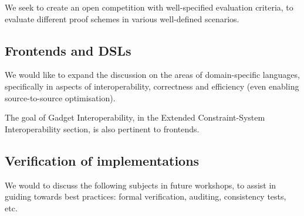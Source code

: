 We seek to create an open competition with well-specified evaluation criteria, to evaluate different proof schemes in various well-defined scenarios.


\subsection{Frontends and DSLs}
\label{implem:goals:frontends-and-DSLs}

We would like to expand the discussion on the areas of domain-specific languages, specifically in aspects of interoperability, correctness and efficiency (even enabling source-to-source optimisation).

The goal of Gadget Interoperability, in the Extended Constraint-System Interoperability section, is also pertinent to frontends.


\subsection{Verification of implementations}
\label{implem:goals:verification-of-implementations}

We would to discuss the following subjects in future workshops, to assist in guiding towards best practices: formal verification, auditing, consistency tests, etc.
